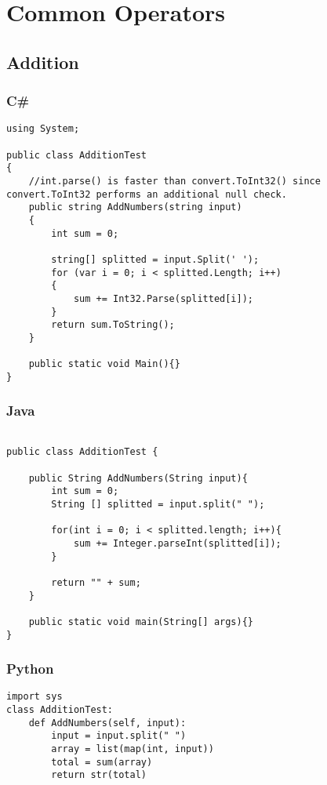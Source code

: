 \section{Common Operators}

\subsection{Addition} \label{appendix:code_addition}

\subsubsection{C\#}
\lstset{style=sharpc}
\begin{lstlisting}
using System;

public class AdditionTest
{
    //int.parse() is faster than convert.ToInt32() since convert.ToInt32 performs an additional null check.
    public string AddNumbers(string input)
    {
        int sum = 0;

        string[] splitted = input.Split(' ');
        for (var i = 0; i < splitted.Length; i++)
        {
            sum += Int32.Parse(splitted[i]);
        }
        return sum.ToString();
    }

    public static void Main(){}
}

\end{lstlisting}

\subsubsection{Java}
\lstset{style=java}
\begin{lstlisting}

public class AdditionTest {

	public String AddNumbers(String input){
		int sum = 0;
		String [] splitted = input.split(" ");

		for(int i = 0; i < splitted.length; i++){
			sum += Integer.parseInt(splitted[i]);
		}

		return "" + sum;
	}

	public static void main(String[] args){}
}

\end{lstlisting}

\subsubsection{Python}
\lstset{style=python}
\begin{lstlisting}
import sys
class AdditionTest:
    def AddNumbers(self, input):
        input = input.split(" ")
        array = list(map(int, input))
        total = sum(array)
        return str(total)
\end{lstlisting}



